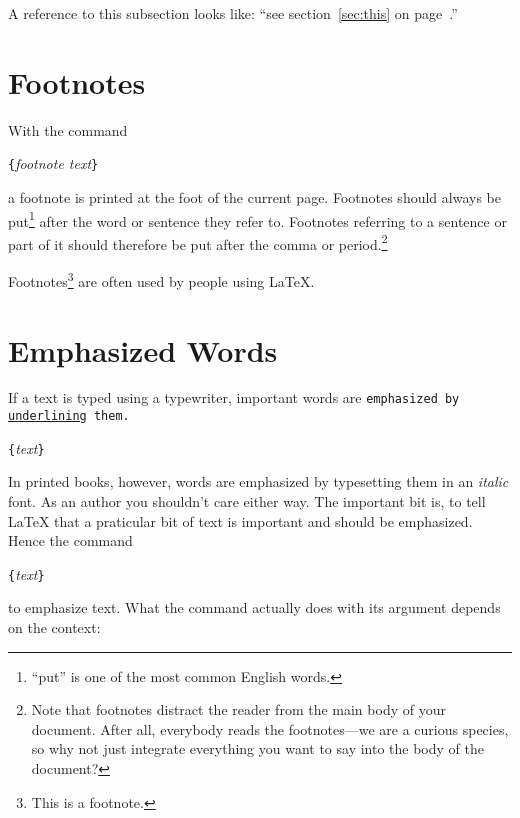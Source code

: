 \begin{example}
A reference to this subsection
\label{sec:this} looks like:
``see section~\ref{sec:this} on 
page~\pageref{sec:this}.''
\end{example}
 
\section{Footnotes}
With the command
\begin{lscommand}
\verb|{|\emph{footnote text}\verb|}|
\end{lscommand}
\noindent a footnote is printed at the foot of the current page.  Footnotes
should always be put\footnote{``put'' is one of the most common
  English words.} after the word or sentence they refer to. Footnotes
referring to a sentence or part of it should therefore be put after
the comma or period.\footnote{Note that footnotes
  distract the reader from the main body of your document. After all,
  everybody reads the footnotes---we are a curious species, so why not
  just integrate everything you want to say into the body of the
  document?\footnotemark}

\begin{example}
Footnotes\footnote{This is 
  a footnote.} are often used 
by people using \LaTeX.
\end{example}
 
\section{Emphasized Words}

If a text is typed using a typewriter, important words are
  \texttt{emphasized by \underline{underlining} them.}
\begin{lscommand}
\verb|{|\emph{text}\verb|}|
\end{lscommand}
In printed books,
however, words are emphasized by typesetting them in an \emph{italic}
font.  As an author you shouldn't care either way. The important bit is, to tell \LaTeX{} that a praticular
bit of text is important and should be emphasized. Hence the command
\begin{lscommand}
\verb|{|\emph{text}\verb|}|
\end{lscommand}
\noindent to emphasize text. What the command actually does with 
its argument depends on the context:

